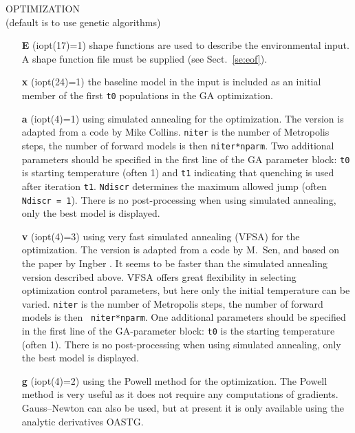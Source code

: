 \documentclass{saclantc}
\begin{document}
\noindent OPTIMIZATION\\
(default is to use genetic algorithms)

\vspace{-0.6cm}
\begin{itemize}
    \item[{\bf E}] (iopt(17)=1) shape functions are used to describe the environmental
input. A shape function file must be supplied (see Sect.\ \ref{se:eof}). 
\vspace{-0.3cm}
    \item[{\bf x}] (iopt(24)=1) the baseline model in the input is included
as an initial member of the first {\tt t0} populations in the GA optimization.  
\vspace{-0.3cm}
    \item[{\bf a}] (iopt(4)=1) using simulated annealing for the optimization.
The version is adapted from a code by Mike Collins. {\tt niter} is the
number of
Metropolis steps, the number of forward models is then {\tt niter*nparm}.
Two additional parameters should be specified in the first line of the
GA parameter block:
{\tt t0}
is starting temperature (often 1) and {\tt t1} indicating that quenching 
is used after iteration
{\tt t1}. {\tt Ndiscr} determines the maximum allowed jump (often 
{\tt Ndiscr = 1}).  
There is no post-processing when using simulated annealing, only the best model
is displayed.
\vspace{-0.3cm}
    \item[{\bf v}] (iopt(4)=3) 
using very fast simulated annealing (VFSA) for the optimization.
The version is adapted from a code by M.~Sen, and based on the paper by
Ingber \cite{ingber:93}. It seems to be faster than the simulated annealing version
described above. VFSA offers great flexibility in selecting
optimization control
parameters, but here only the initial temperature can be varied.
 {\tt niter} is the number of
Metropolis steps, the number of forward models is then {\tt
niter*nparm}.
One additional parameters should be specified in the first line of the
GA-parameter block:
{\tt t0}
is the starting temperature (often 1). 
There is no post-processing when using simulated annealing, only the best model
is displayed.
\vspace{-0.3cm}
    \item[{\bf g}] (iopt(4)=2)  using the Powell method  for the optimization.
The Powell method is very useful as it does not require any
computations of gradients. {Gauss--Newton
      can also be used, but  at present it is only available using the analytic derivatives {\sf OASTG}}.

\end{itemize}
\end{document}
